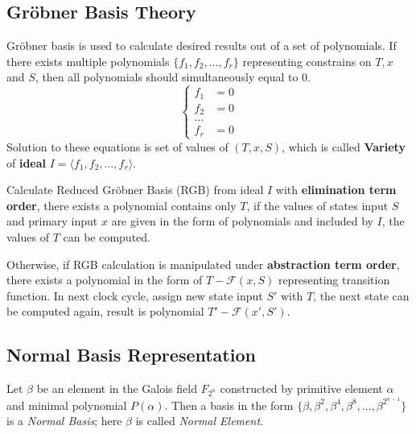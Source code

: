 \documentclass{acm_proc_article-sp}
\begin{document}
\subsection{Gr\"obner Basis Theory}
Gr\"obner basis is used to calculate desired results out of a set of polynomials.
If there exists multiple polynomials $\{f_1, f_2, \dots, f_r\}$ representing constrains on $T, x$ and $S$,
then all polynomials should simultaneously equal to $0$.
\begin{displaymath}
\left\{
  \begin{array}{lc}
  f_1 & = 0\\
  f_2 & = 0\\
  \dots & \ \\
  f_r & = 0
  \end{array} \right.
\end{displaymath}
Solution to these equations is set of values of $(T, x, S)$, which is called \textbf{Variety} of \textbf{ideal}
$I = \langle f_1, f_2, \dots, f_r\rangle $.

Calculate Reduced Gr\"obner Basis (RGB) from ideal $I$ with \textbf{elimination term order}, there exists a polynomial contains
only $T$, if the values of states input $S$ and primary input $x$ are given in the form of polynomials and included by $I$,
the values of $T$ can be computed.

Otherwise, if RGB calculation is manipulated under \textbf{abstraction term order}, there exists a polynomial in
the form of $T - \mathcal{F}(x, S)$ representing transition function. In next clock cycle, assign new state input $S'$ with $T$, the next
state can be computed again, result is polynomial $T' - \mathcal{F}(x', S')$. 

\subsection{Normal Basis Representation}

Let $\beta$ be an element in the Galois field $F_{2^n}$ constructed by primitive element $\alpha$ and minimal polynomial
$P(\alpha)$. Then a basis in the form $\{\beta, \beta^2, \beta^4, \beta^8, ... ,\beta^{2^{n-1}}\}$ is a
\emph{Normal Basis}; here $\beta$ is called \emph{Normal Element}.
\end{document}
